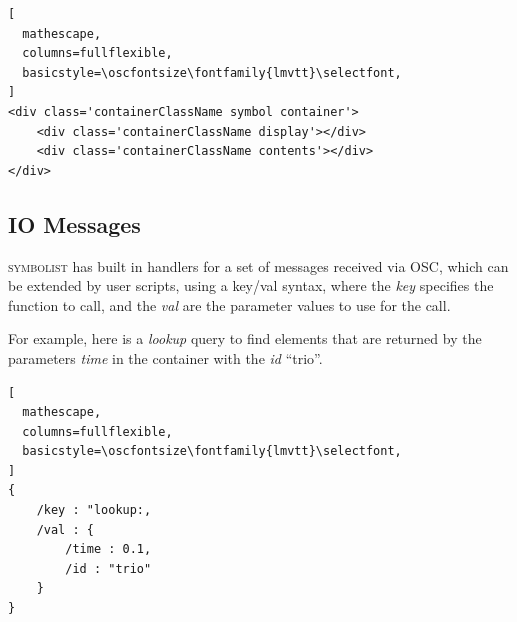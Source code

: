 \documentclass{article}
\def\symbolist{\textsc{symbolist}\xspace}
\def\oscfontsize{\footnotesize}
\begin{document}
\begin{lstlisting}[
  mathescape,
  columns=fullflexible,
  basicstyle=\oscfontsize\fontfamily{lmvtt}\selectfont,
]
<div class='containerClassName symbol container'>
    <div class='containerClassName display'></div>
    <div class='containerClassName contents'></div>
</div>
\end{lstlisting}




\subsection{IO Messages}\label{subsec:io-messages}

\symbolist has built in handlers for a set of messages received via OSC, which can be extended by user scripts, using a key/val syntax, where the \textit{key} specifies the function to call, and the \textit{val} are the parameter values to use for the call.

For example, here is a \textit{lookup} query to find elements that are returned by the parameters \textit{time} in the container with the \textit{id} ``trio''.


\begin{lstlisting}[
  mathescape,
  columns=fullflexible,
  basicstyle=\oscfontsize\fontfamily{lmvtt}\selectfont,
]
{
    /key : "lookup:,
    /val : {
        /time : 0.1,
        /id : "trio"
    }
}

\end{lstlisting}
\end{document}
